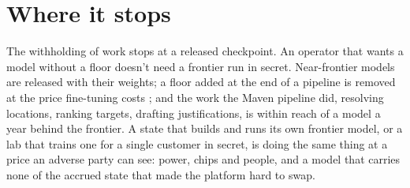 \section{Where it stops}
\label{sec:12.3}
The withholding of work stops at a released checkpoint. An operator that wants a model without a floor doesn't need a frontier run in secret. Near-frontier models are released with their weights; a floor added at the end of a pipeline is removed at the price fine-tuning costs \autocite{qi2024finetuning}; and the work the Maven pipeline did, resolving locations, ranking targets, drafting justifications, is within reach of a model a year behind the frontier. A state that builds and runs its own frontier model, or a lab that trains one for a single customer in secret, is doing the same thing at a price an adverse party can see: power, chips and people, and a model that carries none of the accrued state that made the platform hard to swap.

